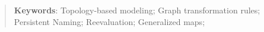 \documentclass[twocolumn,a4paper]{article}
\begin{document}
\begin{abstract}

\textbf{Keywords}: Topology-based modeling; Graph transformation rules; Persistent Naming; Reevaluation; Generalized maps;
\end{abstract}






%


\printbibliography
\end{document}
